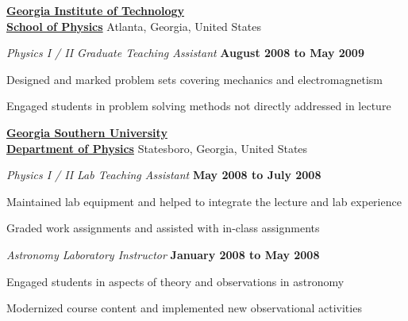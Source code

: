 \documentclass[10pt]{article}
\newenvironment{outerlist}[1][\enskip\textbullet]%
        {\begin{enumerate}[#1]}{\end{enumerate}%
         \vspace{-.6\baselineskip}}
\newenvironment{innerlist}[1][\enskip\textbullet]%
        {\begin{compactenum}[#1]}{\end{compactenum}}
\begin{document}
\href{http://www.gatech.edu}{\textbf{Georgia Institute of Technology}}\\
\href{http://www.physics.gatech.edu}{\textbf{School of Physics}}
\hfill Atlanta, Georgia, United States
\begin{outerlist}
\item[] \textit{Physics I / II Graduate Teaching Assistant}%
        \hfill \textbf{August 2008 to May 2009}
\begin{innerlist}

  \item Designed and marked problem sets covering mechanics and electromagnetism
  \item Engaged students in problem solving methods not directly addressed in lecture
  \\
\end{innerlist}

\end{outerlist}

\href{http://georgiasouthern.edu/physics/}{\textbf{Georgia Southern University}}\\
\href{http://georgiasouthern.edu/physics/}{\textbf{Department of Physics}}
\hfill Statesboro, Georgia, United States
\begin{outerlist}
\item[] \textit{Physics I / II Lab Teaching Assistant}%
        \hfill \textbf{May 2008 to July 2008}
\begin{innerlist}
  \item Maintained lab equipment and helped to integrate the lecture and lab experience
  \item Graded work assignments and assisted with in-class assignments
\end{innerlist}

\end{outerlist}


\begin{outerlist}
\item[] \textit{Astronomy Laboratory Instructor}%
        \hfill \textbf{January 2008 to May 2008}
\begin{innerlist}
  \item Engaged students in aspects of theory and observations in astronomy
  \item Modernized course content and implemented new observational activities
\end{innerlist}

\end{outerlist}
\end{document}
